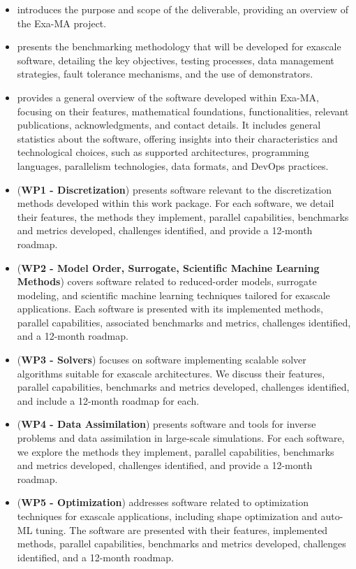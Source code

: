\begin{itemize}
    \item {} introduces the purpose and scope of the deliverable, providing an overview of the Exa-MA project.
    \item {} presents the benchmarking methodology that will be developed for exascale software, detailing the key objectives, testing processes, data management strategies, fault tolerance mechanisms, and the use of demonstrators.
    \item {} provides a general overview of the software developed within Exa-MA, focusing on their features, mathematical foundations, functionalities, relevant publications, acknowledgments, and contact details. It includes general statistics about the software, offering insights into their characteristics and technological choices, such as supported architectures, programming languages, parallelism technologies, data formats, and DevOps practices.
    \item {} (\textbf{WP1 - Discretization}) presents software relevant to the discretization methods developed within this work package. For each software, we detail their features, the methods they implement, parallel capabilities, benchmarks and metrics developed, challenges identified, and provide a 12-month roadmap.
    \item {} (\textbf{WP2 - Model Order, Surrogate, Scientific Machine Learning Methods}) covers software related to reduced-order models, surrogate modeling, and scientific machine learning techniques tailored for exascale applications. Each software is presented with its implemented methods, parallel capabilities, associated benchmarks and metrics, challenges identified, and a 12-month roadmap.
    \item {} (\textbf{WP3 - Solvers}) focuses on software implementing scalable solver algorithms suitable for exascale architectures. We discuss their features, parallel capabilities, benchmarks and metrics developed, challenges identified, and include a 12-month roadmap for each.
    \item {} (\textbf{WP4 - Data Assimilation}) presents software and tools for inverse problems and data assimilation in large-scale simulations. For each software, we explore the methods they implement, parallel capabilities, benchmarks and metrics developed, challenges identified, and provide a 12-month roadmap.
    \item {} (\textbf{WP5 - Optimization}) addresses software related to optimization techniques for exascale applications, including shape optimization and auto-ML tuning. The software are presented with their features, implemented methods, parallel capabilities, benchmarks and metrics developed, challenges identified, and a 12-month roadmap.

\end{itemize}
